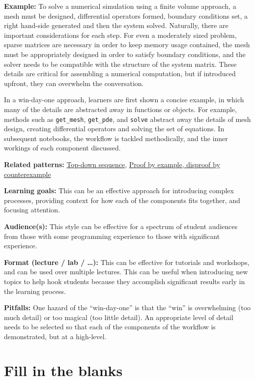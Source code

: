 \documentclass[]{book}
\begin{document}
\textbf{Example:} To solve a numerical simulation using a finite volume
approach, a mesh must be designed, differential operators formed,
boundary conditions set, a right hand-side generated and then the system
solved. Naturally, there are important considerations for each step. For
even a moderately sized problem, sparse matrices are necessary in order
to keep memory usage contained, the mesh must be appropriately designed
in order to satisfy boundary conditions, and the solver needs to be
compatible with the structure of the system matrix. These details are
critical for assembling a numerical computation, but if introduced
upfront, they can overwhelm the conversation.

In a win-day-one approach, learners are first shown a concise example,
in which many of the details are abstracted away in functions or
objects. For example, methods such as \texttt{get\_mesh},
\texttt{get\_pde}, and \texttt{solve} abstract away the details of mesh
design, creating differential operators and solving the set of
equations. In subsequent notebooks, the workflow is tackled
methodically, and the inner workings of each component discussed.

\textbf{Related patterns:}
\protect\hyperlink{top-down-sequence}{Top-down sequence},
\protect\hyperlink{proof-by-example-disproof-by-counterexample}{Proof by
example, disproof by counterexample}

\textbf{Learning goals:} This can be an effective approach for
introducing complex processes, providing context for how each of the
components fits together, and focusing attention.

\textbf{Audience(s):} This style can be effective for a spectrum of
student audiences from those with some programming experience to those
with significant experience.

\textbf{Format (lecture / lab / \ldots{}):} This can be effective for
tutorials and workshops, and can be used over multiple lectures. This
can be useful when introducing new topics to help hook students because
they accomplish significant results early in the learning process.

\textbf{Pitfalls:} One hazard of the ``win-day-one'' is that the ``win''
is overwhelming (too much detail) or too magical (too little detail). An
appropriate level of detail needs to be selected so that each of the
components of the workflow is demonstrated, but at a high-level.

\hypertarget{fill-in-the-blanks}{\section{Fill in the
blanks}\label{fill-in-the-blanks}}
\end{document}
